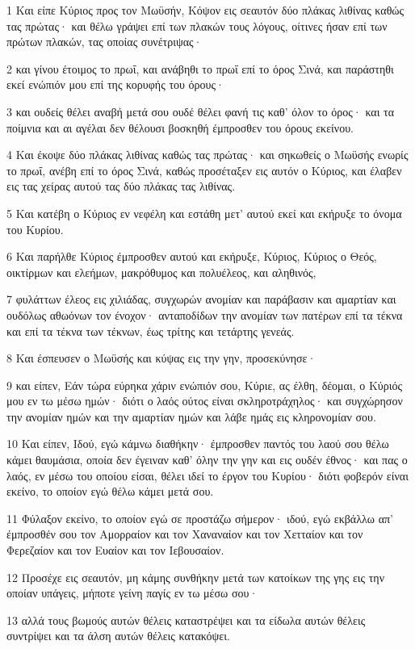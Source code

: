 \par 1 Και είπε Κύριος προς τον Μωϋσήν, Κόψον εις σεαυτόν δύο πλάκας λιθίνας καθώς τας πρώτας· και θέλω γράψει επί των πλακών τους λόγους, οίτινες ήσαν επί των πρώτων πλακών, τας οποίας συνέτριψας·
\par 2 και γίνου έτοιμος το πρωΐ, και ανάβηθι το πρωΐ επί το όρος Σινά, και παράστηθι εκεί ενώπιόν μου επί της κορυφής του όρους·
\par 3 και ουδείς θέλει αναβή μετά σου ουδέ θέλει φανή τις καθ' όλον το όρος· και τα ποίμνια και αι αγέλαι δεν θέλουσι βοσκηθή έμπροσθεν του όρους εκείνου.
\par 4 Και έκοψε δύο πλάκας λιθίνας καθώς τας πρώτας· και σηκωθείς ο Μωϋσής ενωρίς το πρωΐ, ανέβη επί το όρος Σινά, καθώς προσέταξεν εις αυτόν ο Κύριος, και έλαβεν εις τας χείρας αυτού τας δύο πλάκας τας λιθίνας.
\par 5 Και κατέβη ο Κύριος εν νεφέλη και εστάθη μετ' αυτού εκεί και εκήρυξε το όνομα του Κυρίου.
\par 6 Και παρήλθε Κύριος έμπροσθεν αυτού και εκήρυξε, Κύριος, Κύριος ο Θεός, οικτίρμων και ελεήμων, μακρόθυμος και πολυέλεος, και αληθινός,
\par 7 φυλάττων έλεος εις χιλιάδας, συγχωρών ανομίαν και παράβασιν και αμαρτίαν και ουδόλως αθωόνων τον ένοχον· ανταποδίδων την ανομίαν των πατέρων επί τα τέκνα και επί τα τέκνα των τέκνων, έως τρίτης και τετάρτης γενεάς.
\par 8 Και έσπευσεν ο Μωϋσής και κύψας εις την γην, προσεκύνησε·
\par 9 και είπεν, Εάν τώρα εύρηκα χάριν ενώπιόν σου, Κύριε, ας έλθη, δέομαι, ο Κύριός μου εν τω μέσω ημών· διότι ο λαός ούτος είναι σκληροτράχηλος· και συγχώρησον την ανομίαν ημών και την αμαρτίαν ημών και λάβε ημάς εις κληρονομίαν σου.
\par 10 Και είπεν, Ιδού, εγώ κάμνω διαθήκην· έμπροσθεν παντός του λαού σου θέλω κάμει θαυμάσια, οποία δεν έγειναν καθ' όλην την γην και εις ουδέν έθνος· και πας ο λαός, εν μέσω του οποίου είσαι, θέλει ιδεί το έργον του Κυρίου· διότι φοβερόν είναι εκείνο, το οποίον εγώ θέλω κάμει μετά σου.
\par 11 Φύλαξον εκείνο, το οποίον εγώ σε προστάζω σήμερον· ιδού, εγώ εκβάλλω απ' έμπροσθέν σου τον Αμορραίον και τον Χαναναίον και τον Χετταίον και τον Φερεζαίον και τον Ευαίον και τον Ιεβουσαίον.
\par 12 Προσέχε εις σεαυτόν, μη κάμης συνθήκην μετά των κατοίκων της γης εις την οποίαν υπάγεις, μήποτε γείνη παγίς εν τω μέσω σου·
\par 13 αλλά τους βωμούς αυτών θέλεις καταστρέψει και τα είδωλα αυτών θέλεις συντρίψει και τα άλση αυτών θέλεις κατακόψει.
